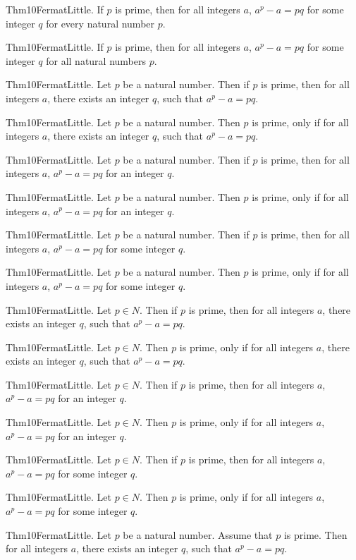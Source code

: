 \documentclass{article}
\begin{document}
Thm10FermatLittle. If $p$ is prime, then for all integers $a$, $a ^ {p}- a = p q$ for some integer $q$ for every natural number $p$.

Thm10FermatLittle. If $p$ is prime, then for all integers $a$, $a ^ {p}- a = p q$ for some integer $q$ for all natural numbers $p$.

Thm10FermatLittle. Let $p$ be a natural number. Then if $p$ is prime, then for all integers $a$, there exists an integer $q$, such that $a ^ {p}- a = p q$.

Thm10FermatLittle. Let $p$ be a natural number. Then $p$ is prime, only if for all integers $a$, there exists an integer $q$, such that $a ^ {p}- a = p q$.

Thm10FermatLittle. Let $p$ be a natural number. Then if $p$ is prime, then for all integers $a$, $a ^ {p}- a = p q$ for an integer $q$.

Thm10FermatLittle. Let $p$ be a natural number. Then $p$ is prime, only if for all integers $a$, $a ^ {p}- a = p q$ for an integer $q$.

Thm10FermatLittle. Let $p$ be a natural number. Then if $p$ is prime, then for all integers $a$, $a ^ {p}- a = p q$ for some integer $q$.

Thm10FermatLittle. Let $p$ be a natural number. Then $p$ is prime, only if for all integers $a$, $a ^ {p}- a = p q$ for some integer $q$.

Thm10FermatLittle. Let $p \in N$. Then if $p$ is prime, then for all integers $a$, there exists an integer $q$, such that $a ^ {p}- a = p q$.

Thm10FermatLittle. Let $p \in N$. Then $p$ is prime, only if for all integers $a$, there exists an integer $q$, such that $a ^ {p}- a = p q$.

Thm10FermatLittle. Let $p \in N$. Then if $p$ is prime, then for all integers $a$, $a ^ {p}- a = p q$ for an integer $q$.

Thm10FermatLittle. Let $p \in N$. Then $p$ is prime, only if for all integers $a$, $a ^ {p}- a = p q$ for an integer $q$.

Thm10FermatLittle. Let $p \in N$. Then if $p$ is prime, then for all integers $a$, $a ^ {p}- a = p q$ for some integer $q$.

Thm10FermatLittle. Let $p \in N$. Then $p$ is prime, only if for all integers $a$, $a ^ {p}- a = p q$ for some integer $q$.

Thm10FermatLittle. Let $p$ be a natural number. Assume that $p$ is prime. Then for all integers $a$, there exists an integer $q$, such that $a ^ {p}- a = p q$.
\end{document}
